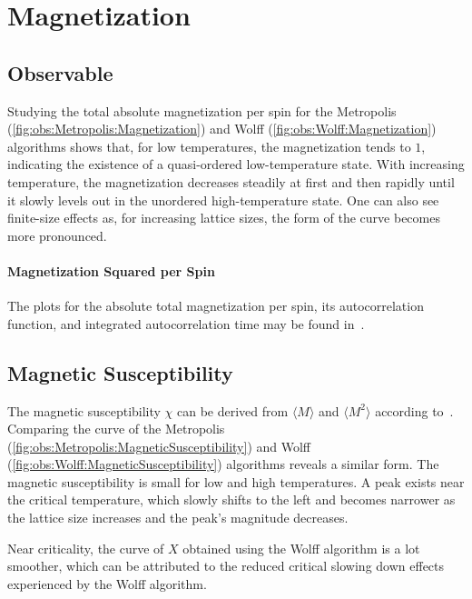\section{Magnetization}
	\subsection{Observable}
		Studying the total absolute magnetization per spin for the Metropolis (\cref{fig:obs:Metropolis:Magnetization}) and Wolff (\cref{fig:obs:Wolff:Magnetization}) algorithms shows that, for low temperatures, the magnetization tends to $1$, indicating the existence of a quasi-ordered low-temperature state. With increasing temperature, the magnetization decreases steadily at first and then rapidly until it slowly levels out in the unordered high-temperature state. One can also see finite-size effects as, for increasing lattice sizes, the form of the curve becomes more pronounced.
		
		\paragraph{Magnetization Squared per Spin} The plots for the absolute total magnetization per spin, its autocorrelation function, and integrated autocorrelation time may be found in~.
	
	\subsection{Magnetic Susceptibility}
		The magnetic susceptibility $\chi$ can be derived from $\langle M \rangle$ and $\langle M^2 \rangle$ according to~.  Comparing the curve of the Metropolis (\cref{fig:obs:Metropolis:MagneticSusceptibility}) and Wolff (\cref{fig:obs:Wolff:MagneticSusceptibility}) algorithms reveals a similar form. The magnetic susceptibility is small for low and high temperatures. A peak exists near the critical temperature, which slowly shifts to the left and becomes narrower as the lattice size increases and the peak's magnitude decreases.
		
		Near criticality, the curve of $X$ obtained using the Wolff algorithm is a lot smoother, which can be attributed to the reduced critical slowing down effects experienced by the Wolff algorithm.
	

